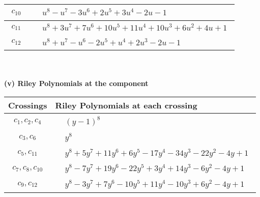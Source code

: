 \documentclass[1p]{elsarticle_modified}
\theoremstyle{definition}
\begin{document}
\begin{tabular}{m{50pt}|m{274pt}}
\hline $$\begin{aligned}c_{10}\end{aligned}$$&$\begin{aligned}
&u^8- u^7-3 u^6+2 u^5+3 u^4-2 u-1
\end{aligned}$\\
\hline $$\begin{aligned}c_{11}\end{aligned}$$&$\begin{aligned}
&u^8+3 u^7+7 u^6+10 u^5+11 u^4+10 u^3+6 u^2+4 u+1
\end{aligned}$\\
\hline $$\begin{aligned}c_{12}\end{aligned}$$&$\begin{aligned}
&u^8+u^7- u^6-2 u^5+u^4+2 u^3-2 u-1
\end{aligned}$\\
\hline
\end{tabular}\\~\\
\newpage\renewcommand{\arraystretch}{1}
\flushleft \textbf{(v) Riley Polynomials at the component}\newline \\
\begin{tabular}{m{50pt}|m{274pt}}
Crossings & \hspace{64pt}Riley Polynomials at each crossing \\
\hline $$\begin{aligned}c_{1},c_{2},c_{4}\end{aligned}$$&$\begin{aligned}
&(y-1)^8
\end{aligned}$\\
\hline $$\begin{aligned}c_{3},c_{6}\end{aligned}$$&$\begin{aligned}
&y^8
\end{aligned}$\\
\hline $$\begin{aligned}c_{5},c_{11}\end{aligned}$$&$\begin{aligned}
&y^8+5 y^7+11 y^6+6 y^5-17 y^4-34 y^3-22 y^2-4 y+1
\end{aligned}$\\
\hline $$\begin{aligned}c_{7},c_{8},c_{10}\end{aligned}$$&$\begin{aligned}
&y^8-7 y^7+19 y^6-22 y^5+3 y^4+14 y^3-6 y^2-4 y+1
\end{aligned}$\\
\hline $$\begin{aligned}c_{9},c_{12}\end{aligned}$$&$\begin{aligned}
&y^8-3 y^7+7 y^6-10 y^5+11 y^4-10 y^3+6 y^2-4 y+1
\end{aligned}$\\
\hline
\end{tabular}\\~\\
\end{document}
